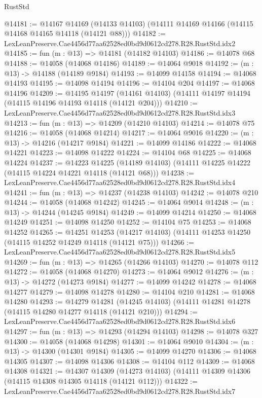 \begin{lexlean}{RustStd}
\begin{coremodule}
@14181 := @14167
    @14169
    (@14133 @14103)
    (@14111 @14169 @14166 (@14115 @14168 @14165 @14118 (@14121 @88)))
@14182 := LexLeanPreserve.Cae4456d77aa62528ed0bd9d0612cd278.R28.RustStd.idx2
@14185 := fun (m : @13) => @14181 (@14182 @14103)
@14186 := @14078 @68
@14188 := @14058 (@14068 @14186)
@14189 := @14064 @9018
@14192 := (m : @13) -> @14188 (@14189 @9184)
@14193 := @14099 @14158
@14194 := @14068 @14193
@14195 := @14098 @14194
@14196 := @14104 @204
@14197 := @14068 @14196
@14209 := @14195
    @14197
    (@14161 @14103)
    (@14111 @14197 @14194 (@14115 @14196 @14193 @14118 (@14121 @204)))
@14210 := LexLeanPreserve.Cae4456d77aa62528ed0bd9d0612cd278.R28.RustStd.idx3
@14213 := fun (m : @13) => @14209 (@14210 @14103)
@14214 := @14078 @75
@14216 := @14058 (@14068 @14214)
@14217 := @14064 @9016
@14220 := (m : @13) -> @14216 (@14217 @9184)
@14221 := @14099 @14186
@14222 := @14068 @14221
@14223 := @14098 @14222
@14224 := @14104 @68
@14225 := @14068 @14224
@14237 := @14223
    @14225
    (@14189 @14103)
    (@14111 @14225 @14222 (@14115 @14224 @14221 @14118 (@14121 @68)))
@14238 := LexLeanPreserve.Cae4456d77aa62528ed0bd9d0612cd278.R28.RustStd.idx4
@14241 := fun (m : @13) => @14237 (@14238 @14103)
@14242 := @14078 @210
@14244 := @14058 (@14068 @14242)
@14245 := @14064 @9014
@14248 := (m : @13) -> @14244 (@14245 @9184)
@14249 := @14099 @14214
@14250 := @14068 @14249
@14251 := @14098 @14250
@14252 := @14104 @75
@14253 := @14068 @14252
@14265 := @14251
    @14253
    (@14217 @14103)
    (@14111 @14253 @14250 (@14115 @14252 @14249 @14118 (@14121 @75)))
@14266 := LexLeanPreserve.Cae4456d77aa62528ed0bd9d0612cd278.R28.RustStd.idx5
@14269 := fun (m : @13) => @14265 (@14266 @14103)
@14270 := @14078 @112
@14272 := @14058 (@14068 @14270)
@14273 := @14064 @9012
@14276 := (m : @13) -> @14272 (@14273 @9184)
@14277 := @14099 @14242
@14278 := @14068 @14277
@14279 := @14098 @14278
@14280 := @14104 @210
@14281 := @14068 @14280
@14293 := @14279
    @14281
    (@14245 @14103)
    (@14111 @14281 @14278 (@14115 @14280 @14277 @14118 (@14121 @210)))
@14294 := LexLeanPreserve.Cae4456d77aa62528ed0bd9d0612cd278.R28.RustStd.idx6
@14297 := fun (m : @13) => @14293 (@14294 @14103)
@14298 := @14078 @327
@14300 := @14058 (@14068 @14298)
@14301 := @14064 @9010
@14304 := (m : @13) -> @14300 (@14301 @9184)
@14305 := @14099 @14270
@14306 := @14068 @14305
@14307 := @14098 @14306
@14308 := @14104 @112
@14309 := @14068 @14308
@14321 := @14307
    @14309
    (@14273 @14103)
    (@14111 @14309 @14306 (@14115 @14308 @14305 @14118 (@14121 @112)))
@14322 := LexLeanPreserve.Cae4456d77aa62528ed0bd9d0612cd278.R28.RustStd.idx7

\end{coremodule}
\end{lexlean}
